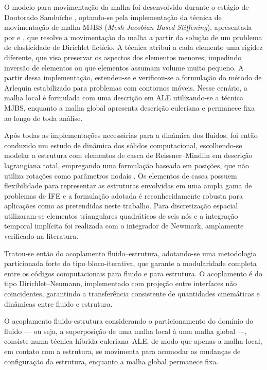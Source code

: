 O modelo para movimentação da malha foi desenvolvido durante o estágio de Doutorado Sanduíche \cite{Tononetal:2021}, optando-se pela implementação da técnica de movimentação de malha MJBS  (\textit{Mesh-Jacobian Based Stiffening}), apresentada por  e , que resolve a movimentação da malha a partir da solução de um problema de elasticidade de Dirichlet fictício. A técnica atribui a cada elemento uma rigidez diferente, que visa preservar os aspectos dos elementos menores, impedindo inversão de elementos ou que elementos assumam volume muito pequeno. A partir dessa implementação, estendeu-se e verificou-se a formulação do método de Arlequin estabilizado para problemas com contornos móveis. Nesse cenário, a malha local é formulada com uma descrição em ALE utilizando-se a técnica MJBS, enquanto a malha global apresenta descrição euleriana e permanece fixa ao longo de toda análise.

Após todas as implementações necessárias para a dinâmica dos fluidos, foi então conduzido um estudo de dinâmica dos sólidos computacional, escolhendo-se modelar a estrutura com elementos de casca de Reissner–Mindlin em descrição lagrangiana total, empregando uma formulação baseada em posições, que não utiliza rotações como parâmetros nodais \cite{CodaP:2007, SanchesC:2013}. Os elementos de casca possuem flexibilidade para representar as estruturas envolvidas em uma ampla gama de problemas de IFE e a formulação adotada é reconhecidamente robusta para aplicações como as pretendidas neste trabalho. Para discretização espacial utilizaram-se elementos triangulares quadráticos de seis nós e a integração temporal implícita foi realizada com o integrador de Newmark, amplamente verificado na literatura.

Tratou-se então do acoplamento fluido–estrutura, adotando-se uma metodologia particionada forte do tipo bloco-iterativa, que garante a modularidade completa entre os códigos computacionais para fluido e para estrutura. O acoplamento é do tipo Dirichlet–Neumann, implementado com projeção entre interfaces não coincidentes, garantindo a transferência consistente de quantidades cinemáticas e dinâmicas entre fluido e estrutura.

O acoplamento fluido-estrutura considerando o particionamento do domínio do fluido — ou seja, a superposição de uma malha local à uma malha global —, consiste numa técnica híbrida euleriana–ALE, de modo que apenas a malha local, em contato com a estrutura, se movimenta para acomodar as mudanças de configuração da estrutura, enquanto a malha global permanece fixa.

